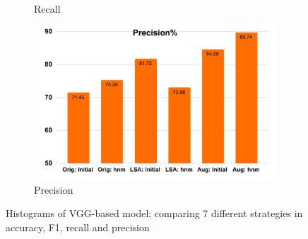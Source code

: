 \begin{figure}[!htb]
\begin{subfigure}[b]{0.5\linewidth}
          \caption{Recall}
     \end{subfigure}
     \begin{subfigure}[b]{0.5\linewidth}
         \centering
          \includegraphics[scale=0.35]{Figs/chap4/vggpre.pdf}
          \caption{Precision}
     \end{subfigure}
  \caption{Histograms of VGG-based model: comparing 7 different strategies in accuracy, F1, recall and precision}
  \label{Fig:histvgg}
\end{figure}
